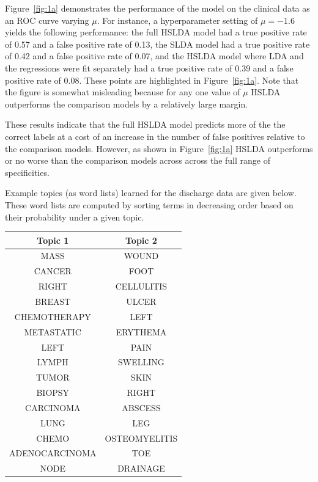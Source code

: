 Figure~\ref{fig:1a} demonstrates the performance of the model on the clinical data as an ROC curve varying $\mu$.  For instance, 
a hyperparameter setting of $\mu=-1.6$ yields the following performance:
the full HSLDA model had a 
true positive rate of 0.57 and a false positive rate of 0.13, the SLDA model
had a true positive rate of 0.42 and a false positive rate of 0.07, and the
HSLDA model where LDA and the regressions were fit separately had a true
positive rate of 0.39 and a false positive rate of 0.08. These points are highlighted in Figure~\ref{fig:1a}.  Note that the figure is somewhat misleading because for any one value of $\mu$ HSLDA outperforms the comparison models by a relatively large margin. 

These results indicate that the full HSLDA model predicts more of the the
correct labels at a cost of an increase in the number of false positives
relative to the comparison models.  However, as shown in Figure~\ref{fig:1a}  HSLDA outperforms or no worse than the comparison models across across the full range of specificities.  


Example topics (as word lists) learned for the discharge data are given below.  These word lists are computed by sorting
terms in decreasing order based on their probability under a given topic.

\begin{extract}
\begin{tabular}{|c|c|}
\hline
\textbf{Topic 1} & \textbf{Topic 2} \\ \hline \hline
MASS & WOUND \\
\hline
CANCER & FOOT \\
\hline
RIGHT & CELLULITIS \\
\hline
BREAST & ULCER \\
\hline
CHEMOTHERAPY & LEFT \\
\hline
METASTATIC & ERYTHEMA \\
\hline
LEFT & PAIN \\
\hline
LYMPH & SWELLING \\
\hline
TUMOR & SKIN \\
\hline
BIOPSY & RIGHT \\
\hline
CARCINOMA & ABSCESS \\
\hline
LUNG & LEG \\
\hline
CHEMO & OSTEOMYELITIS \\
\hline
ADENOCARCINOMA & TOE \\
\hline
NODE & DRAINAGE \\
\hline
\end{tabular}
\end{extract}

